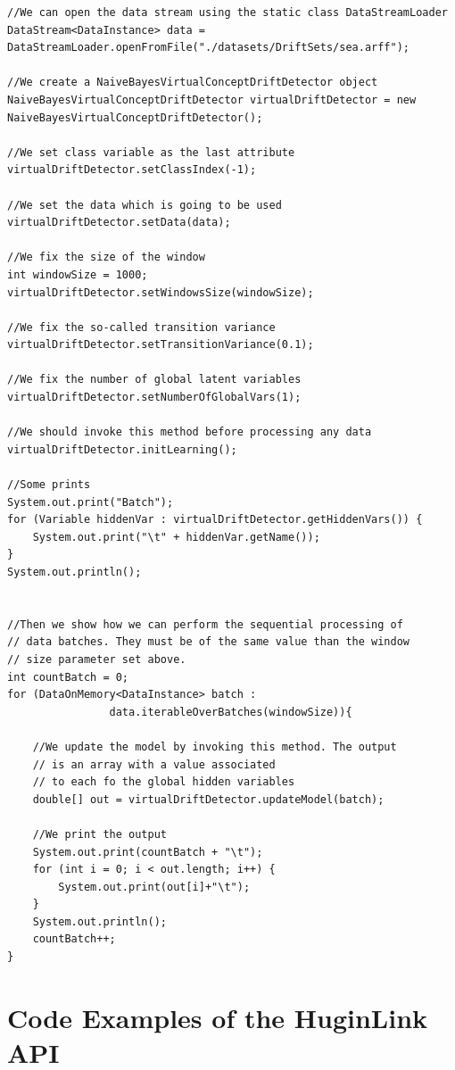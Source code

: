 \begin{lstlisting}
//We can open the data stream using the static class DataStreamLoader
DataStream<DataInstance> data = DataStreamLoader.openFromFile("./datasets/DriftSets/sea.arff");

//We create a NaiveBayesVirtualConceptDriftDetector object
NaiveBayesVirtualConceptDriftDetector virtualDriftDetector = new NaiveBayesVirtualConceptDriftDetector();

//We set class variable as the last attribute
virtualDriftDetector.setClassIndex(-1);

//We set the data which is going to be used
virtualDriftDetector.setData(data);

//We fix the size of the window
int windowSize = 1000;
virtualDriftDetector.setWindowsSize(windowSize);

//We fix the so-called transition variance
virtualDriftDetector.setTransitionVariance(0.1);

//We fix the number of global latent variables
virtualDriftDetector.setNumberOfGlobalVars(1);

//We should invoke this method before processing any data
virtualDriftDetector.initLearning();

//Some prints
System.out.print("Batch");
for (Variable hiddenVar : virtualDriftDetector.getHiddenVars()) {
    System.out.print("\t" + hiddenVar.getName());
}
System.out.println();


//Then we show how we can perform the sequential processing of
// data batches. They must be of the same value than the window
// size parameter set above.
int countBatch = 0;
for (DataOnMemory<DataInstance> batch : 
				data.iterableOverBatches(windowSize)){

    //We update the model by invoking this method. The output
    // is an array with a value associated
    // to each fo the global hidden variables
    double[] out = virtualDriftDetector.updateModel(batch);

    //We print the output
    System.out.print(countBatch + "\t");
    for (int i = 0; i < out.length; i++) {
        System.out.print(out[i]+"\t");
    }
    System.out.println();
    countBatch++;
}
\end{lstlisting}

\chapter{Code Examples of the HuginLink API}\label{sec:codeExamples}

